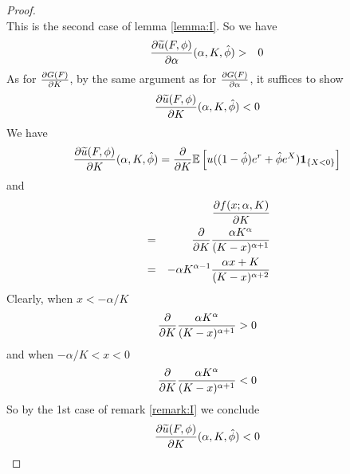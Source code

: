 \documentclass[11pt,a4]{amsart}
\newcommand{\pd}{\partial}
\newcommand{\wt}{\widetilde}
\newcommand{\E }{{\mathbb E}}
\newcommand{\1}{{\mathbf 1}}
\begin{document}
\begin{proof}
\[  \]
  This is the second case of lemma \ref{lemma:I}. So we have
  \begin{eqnarray*}
    {\pd \wt u(F, \phi) \over \pd \alpha}(\alpha, K, \hat\phi) &>& 0
  \end{eqnarray*}
  As for ${\pd G(F) \over \pd K}$, by the same argument as for
  ${\pd G(F) \over \pd \alpha}$, it suffices to show
  \[
  {\pd \wt u(F, \phi) \over \pd K}(\alpha, K, \hat\phi) < 0
  \]
  We have
  \[
  {\pd \wt u(F, \phi) \over \pd K}(\alpha, K, \hat\phi)
  = {\partial \over \partial K} \E \left[
    u((1 - \hat\phi) e^r + \hat\phi e^X) \1_{\{X < 0\}}
  \right] 
  \]
  and
  \begin{eqnarray*}
    && {\pd f(x; \alpha, K) \over \pd K} \\
    &=& {\partial \over \partial K} {\alpha K^\alpha \over (K - x)^{\alpha + 1}} \\
    &=&
    -\alpha K^{\alpha - 1} {
      \alpha x + K
      \over
      (K - x)^{\alpha + 2}
    }
  \end{eqnarray*}
  Clearly, when $x < -\alpha/K$
  \[
  {\partial \over \partial K} {\alpha K^\alpha \over (K - x)^{\alpha + 1}} > 0
  \]
  and when $-\alpha/K < x < 0$
  \[
  {\partial \over \partial K} {\alpha K^\alpha \over (K - x)^{\alpha + 1}} < 0
  \]
  So by the 1st case of remark \ref{remark:I} we conclude
  \[
  {\pd \wt u(F, \phi) \over \pd K}(\alpha, K, \hat\phi) < 0  
  \]
\end{proof}
\end{document}
